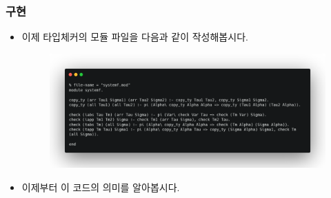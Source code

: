 \documentclass[slidestop,compress,mathserif]{beamer}
\begin{document}
    \begin{frame}
        \frametitle{구현}
        \begin{itemize}
            \item 이제 타입체커의 모듈 파일을 다음과 같이 작성해봅시다.
            \begin{figure}[h]
                \begin{center}
                    \includegraphics[width=1.0\linewidth]{mod.png}
                \end{center}
            \end{figure}
            \item 이제부터 이 코드의 의미를 알아봅시다.
        \end{itemize}
    \end{frame}
\end{document}
